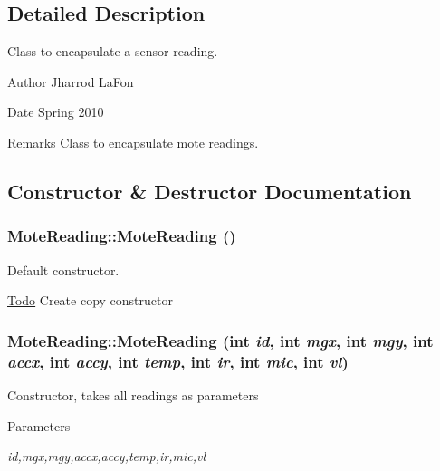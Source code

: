 \subsection{Detailed Description}
Class to encapsulate a sensor reading. \begin{DoxyAuthor}{Author}
Jharrod LaFon 
\end{DoxyAuthor}
\begin{DoxyDate}{Date}
Spring 2010 
\end{DoxyDate}
\begin{DoxyRemark}{Remarks}
Class to encapsulate mote readings. 
\end{DoxyRemark}


\subsection{Constructor \& Destructor Documentation}
\hypertarget{classMoteReading_ad2555254ab4fd4ce31ebafeea362d255}{
\subsubsection[{MoteReading}]{\setlength{\rightskip}{0pt plus 5cm}MoteReading::MoteReading ()}}
\label{classMoteReading_ad2555254ab4fd4ce31ebafeea362d255}


Default constructor. 

\begin{Desc}
\item[\hyperlink{todo__todo000002}{Todo}]Create copy constructor \end{Desc}
\hypertarget{classMoteReading_aea4d9a40d3999ed29eb6044146a5dabc}{
\subsubsection[{MoteReading}]{\setlength{\rightskip}{0pt plus 5cm}MoteReading::MoteReading (int {\em id}, \/  int {\em mgx}, \/  int {\em mgy}, \/  int {\em accx}, \/  int {\em accy}, \/  int {\em temp}, \/  int {\em ir}, \/  int {\em mic}, \/  int {\em vl})}}
\label{classMoteReading_aea4d9a40d3999ed29eb6044146a5dabc}
Constructor, takes all readings as parameters 
\begin{DoxyParams}{Parameters}
\item[{\em id,mgx,mgy,accx,accy,temp,ir,mic,vl}]\end{DoxyParams}


